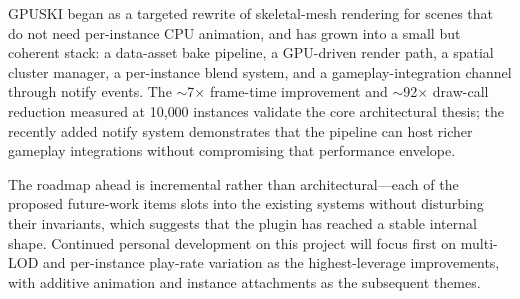 \documentclass[11pt, a4paper]{article}
\begin{document}
GPUSKI began as a targeted rewrite of skeletal-mesh rendering for scenes that do not need per-instance CPU animation, and has grown into a small but coherent stack: a data-asset bake pipeline, a GPU-driven render path, a spatial cluster manager, a per-instance blend system, and a gameplay-integration channel through notify events. The $\sim$7$\times$ frame-time improvement and $\sim$92$\times$ draw-call reduction measured at 10{,}000 instances validate the core architectural thesis; the recently added notify system demonstrates that the pipeline can host richer gameplay integrations without compromising that performance envelope.

The roadmap ahead is incremental rather than architectural---each of the proposed future-work items slots into the existing systems without disturbing their invariants, which suggests that the plugin has reached a stable internal shape. Continued personal development on this project will focus first on multi-LOD and per-instance play-rate variation as the highest-leverage improvements, with additive animation and instance attachments as the subsequent themes.
\end{document}
